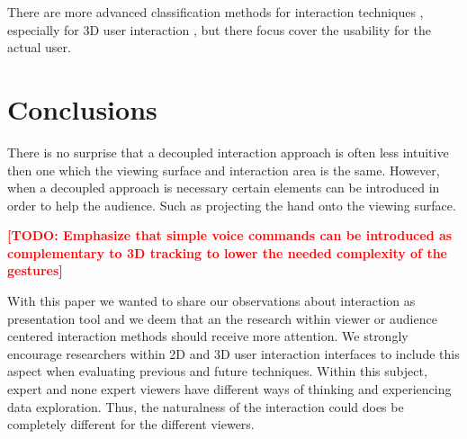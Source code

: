 \documentclass[review,journal]{vgtc}         %
\newcommand{\todo}[1]{\textbf{\textcolor{red}{[TODO: {#1}]}}}
\begin{document}
There are more advanced classification methods for interaction techniques \cite{stars:65-93:2012}, especially for 3D user interaction \cite{CGF:CGF194, Kettner95aclassification, 978-3-319-07458-0_1}, but there focus cover the usability for the actual user.

\section{Conclusions}\label{sec:conclusion}

There is no surprise that a decoupled interaction approach is often less intuitive then one which the viewing surface and interaction area is the same.
However, when a decoupled approach is necessary certain elements can be introduced in order to help the audience.
Such as projecting the hand onto the viewing surface.

\todo{Emphasize that simple voice commands can be introduced as complementary to 3D tracking to lower the needed complexity of the gestures}

With this paper we wanted to share our observations about interaction as presentation tool and we deem that an the research within viewer or audience centered interaction methods should receive more attention. We strongly encourage researchers within 2D and 3D user interaction interfaces to include this aspect when evaluating previous and future techniques.
Within this subject, expert and none expert viewers have different ways of thinking and experiencing data exploration. Thus, the naturalness of the interaction could does be completely different for the different viewers.



\end{document}
